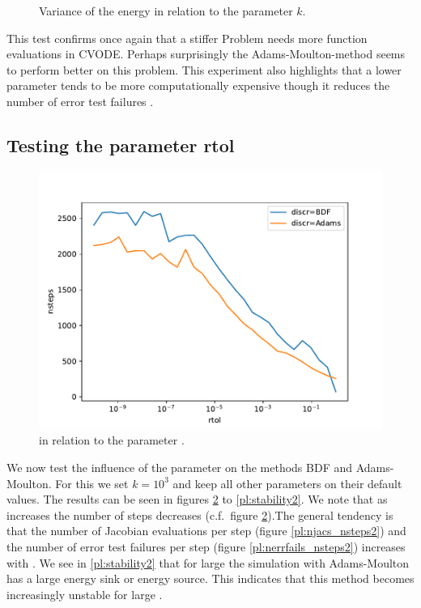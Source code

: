 \documentclass{report}
\begin{document}
\begin{figure}[h]
\begin{minipage}[b]{0.45\textwidth}
\caption{Variance of the energy in relation to the parameter $k$.}
\label{pl:stability1}
\end{minipage}
\end{figure}

This test confirms once again that a stiffer Problem needs more function evaluations in CVODE.
Perhaps surprisingly the Adams-Moulton-method seems to perform better on this problem.
This experiment also highlights that a lower  parameter tends to be more computationally expensive though it reduces the number of error test failures .

\subsection*{Testing the parameter rtol}

\begin{figure}
\centering
\begin{minipage}[t]{0.45\textwidth}
\centering
\includegraphics[width=\textwidth]{../Plots/Task4/Figure_300}
\caption{ in relation to the parameter .}
\label{pl:nsteps2}
\end{minipage}
\end{figure}

We now test the influence of the parameter  on the methods BDF and Adams-Moulton. For this we set $k=10^3$ and keep all other parameters on their default values. The results can be seen in figures \ref{pl:nsteps2} to \ref{pl:stability2}. We note that as  increases the number of steps decreases (c.f.\ figure \ref{pl:nsteps2}).The general tendency is that the number of Jacobian evaluations per step (figure \ref{pl:njacs_nsteps2}) and the number of error test failures per step (figure \ref{pl:nerrfails_nsteps2}) increases with . We see in \ref{pl:stability2} that for large  the simulation with Adams-Moulton has a large energy sink or energy source. This indicates that this method becomes increasingly unstable for large .
\end{document}
